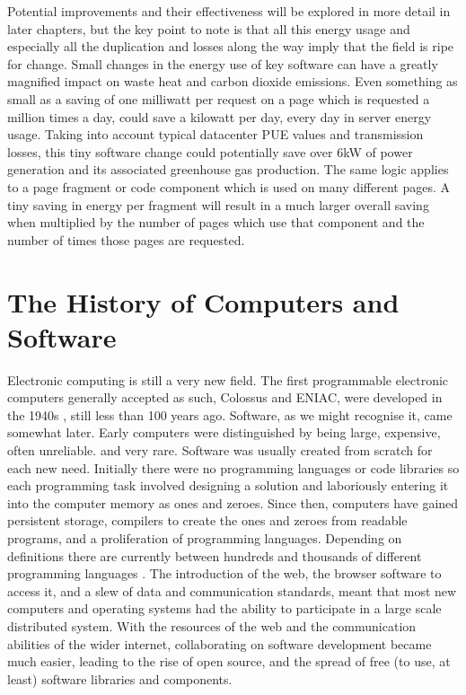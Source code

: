 Potential improvements and their effectiveness will be explored in more detail in later chapters, but the key point to note is that all this energy usage and especially all the duplication and losses along the way imply that the field is ripe for change. Small changes in the energy use of key software can have a greatly magnified impact on waste heat and carbon dioxide emissions. Even something as small as a saving of one milliwatt per request on a page which is requested a million times a day, could save a kilowatt per day, every day in server energy usage. Taking into account typical datacenter PUE values and transmission losses, this tiny software change could potentially save over 6kW of power generation and its associated greenhouse gas production. The same logic applies to a page fragment or code component which is used on many different pages. A tiny saving in energy per fragment will result in a much larger overall saving when multiplied by the number of pages which use that component and the number of times those pages are requested.

\section{The History of Computers and Software}
\label{section:context history}

Electronic computing is still a very new field. The first programmable electronic computers generally accepted as such, Colossus and ENIAC, were developed in the 1940s \citep{Campbell-Kelly2023}, still less than 100 years ago. Software, as we might recognise it, came somewhat later. Early computers were distinguished by being large, expensive, often unreliable. and very rare. Software was usually created from scratch for each new need. Initially there were no programming languages or code libraries so each programming task involved designing a solution and laboriously entering it into the computer memory as ones and zeroes. Since then, computers have gained persistent storage, compilers to create the ones and zeroes from readable programs, and a proliferation of \gls{programming language}s. Depending on definitions there are currently between hundreds and thousands of different programming languages \citep{Pigott2020}. The introduction of the web, the browser software to access it, and a slew of data and communication standards, meant that most new computers and operating systems had the ability to participate in a large scale distributed system. With the resources of the web and the communication abilities of the wider internet, collaborating on software development became much easier, leading to the rise of open source, and the spread of free (to use, at least) software libraries and components.

